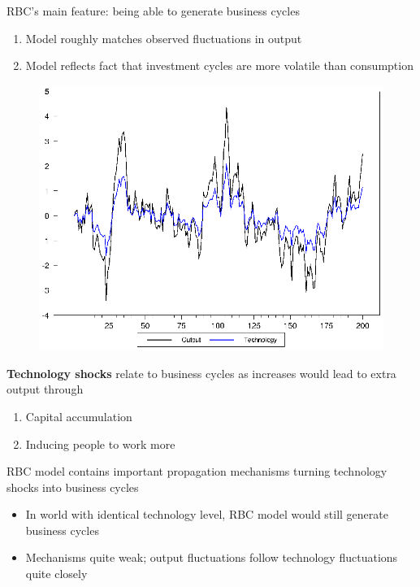 \documentclass{beamer}
\begin{document}
\begin{frame}
  RBC's main feature: being able to generate business cycles\\  
\begin{enumerate}
  \item Model roughly matches observed fluctuations in output
  \item Model reflects fact that investment cycles are more volatile than consumption
\end{enumerate}
\end{frame}

\begin{frame}
  \begin{figure}
    \includegraphics[scale=.9]{rbc2.eps}
  \end{figure}
\end{frame}

\begin{frame}
  \textbf{Technology shocks} relate to business cycles as increases would lead to extra output through
  \begin{enumerate}
    \item Capital accumulation
    \item Inducing people to work more
  \end{enumerate}
  \medskip
  RBC model contains important propagation mechanisms turning technology shocks into business cycles
  \begin{itemize}
    \item In world with identical technology level, RBC model would still generate business cycles
    \item Mechanisms quite weak; output fluctuations follow technology fluctuations quite closely
  \end{itemize}
\end{frame}
\end{document}
